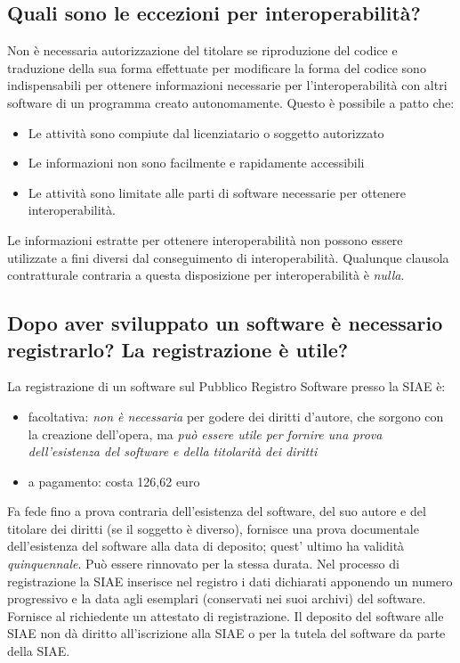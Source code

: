 \subsection{Quali sono le eccezioni per interoperabilità?}
Non è necessaria autorizzazione del titolare se riproduzione del codice e traduzione della sua forma effettuate per modificare la forma del codice
sono indispensabili per ottenere informazioni necessarie per l'interoperabilità con altri software di un programma creato
autonomamente. Questo è possibile a patto che:
\begin{itemize}
    \item Le attività sono compiute dal licenziatario o soggetto autorizzato
    \item Le informazioni non sono facilmente e rapidamente accessibili
    \item Le attività sono limitate alle parti di software necessarie per ottenere interoperabilità.
\end{itemize}
Le informazioni estratte per ottenere interoperabilità non possono essere utilizzate a fini diversi dal conseguimento di interoperabilità. Qualunque clausola contratturale
contraria a questa disposizione per interoperabilità è \emph{nulla}.

\subsection{Dopo aver sviluppato un software è necessario registrarlo? La registrazione è utile?}
La registrazione di un software sul Pubblico Registro Software presso la SIAE è:
\begin{itemize}
    \item facoltativa: \emph{non è necessaria} per godere dei diritti d'autore, che sorgono con la creazione dell'opera,
    ma \emph{può essere utile per fornire una prova dell'esistenza del software e della titolarità dei diritti}
    \item a pagamento: costa 126,62 euro
\end{itemize}
Fa fede fino a prova contraria dell'esistenza del software, del suo autore e del titolare dei diritti (se il soggetto è diverso),
fornisce una prova documentale dell'esistenza del software alla data di deposito; quest' ultimo ha validità \emph{quinquennale}. Può
essere rinnovato per la stessa durata.\newline
Nel processo di registrazione la SIAE inserisce nel registro i dati dichiarati apponendo un numero progressivo e la data agli esemplari (conservati nei suoi archivi)
del software. Fornisce al richiedente un attestato di registrazione.\newline
Il deposito del software alle SIAE non dà diritto all'iscrizione alla SIAE o per la tutela del software
da parte della SIAE.

